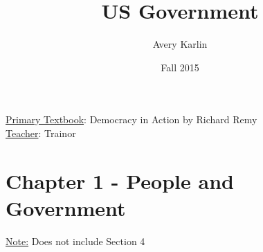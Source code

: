 \documentclass[11 pt, twoside]{article}
\begin{document}
\title{US Government}
\author{Avery Karlin}
\date{Fall 2015}
\newcommand{\textbook}{Democracy in Action by Richard Remy}
\newcommand{\teacher}{Trainor}

\maketitle
\newpage
\hypertarget{content}{\tableofcontents}
\vspace{11pt}
\noindent
\underline{Primary Textbook}: \textbook\\
\underline{Teacher}: \teacher
\newpage

\section{Chapter 1 - People and Government}
\underline{Note:} Does not include Section 4
\end{document}
